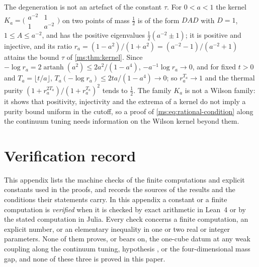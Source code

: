 \documentclass[11pt,a4paper]{amsart}
\theoremstyle{definition}
\theoremstyle{remark}
\numberwithin{equation}{section}
\newcommand{\Mcirc}{\text{\upshape(M$^{\circ}$)}}   %
\newcommand{\hypW}{\text{\upshape(W)}}              %
\begin{document}
The degeneration is not an artefact of the constant $\tau$. For $0<a<1$ the kernel $K_a=\bigl(\begin{smallmatrix}a^{-2}&1\\1&a^{-2}\end{smallmatrix}\bigr)$ on two points of mass $\frac12$ is of the form $DAD$ with $D=1$, $1\le A\le a^{-2}$, and has the positive eigenvalues $\frac12(a^{-2}\pm1)$; it is positive and injective, and its ratio $r_a=(1-a^2)/(1+a^2)=(a^{-2}-1)/(a^{-2}+1)$ attains the bound $\tau$ of \cref{ms:thm:kernel}. Since $-\log r_a=2\operatorname{artanh}(a^2)\le2a^2/(1-a^4)$, $-a^{-1}\log r_a\to0$, and for fixed $t>0$ and $T_a=\lfloor t/a\rfloor$, $T_a(-\log r_a)\le2ta/(1-a^4)\to0$; so $r_a^{T_a}\to1$ and the thermal purity $(1+r_a^{2T_a})/(1+r_a^{T_a})^2$ tends to $\frac12$. The family $K_a$ is not a Wilson family: it shows that positivity, injectivity and the extrema of a kernel do not imply a purity bound uniform in the cutoff, so a proof of \eqref{ms:eq:rational-condition} along the continuum tuning needs information on the Wilson kernel beyond them.
\section{Verification record}\label{app:verification}

This appendix lists the machine checks of the finite computations and explicit constants used in the proofs, and records the sources of the results and the conditions their statements carry. In this appendix a constant or a finite computation is \emph{verified} when it is checked by exact arithmetic in Lean~4 or by the stated computation in Julia. Every check concerns a finite computation, an explicit number, or an elementary inequality in one or two real or integer parameters. None of them proves, or bears on, the one-cube datum \Mcirc{} at any weak coupling along the continuum tuning, hypothesis \hypW{}, or the four-dimensional mass gap, and none of these three is proved in this paper.
\end{document}
